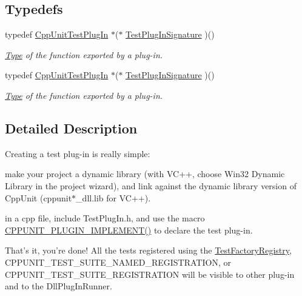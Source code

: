 \subsection*{Typedefs}
\begin{DoxyCompactItemize}
\item 
\hypertarget{group___writing_test_plug_in_gac6d885a430c48cf8b0a4534e8806c657}{typedef \hyperlink{struct_cpp_unit_test_plug_in}{Cpp\+Unit\+Test\+Plug\+In} $\ast$($\ast$ \hyperlink{group___writing_test_plug_in_gac6d885a430c48cf8b0a4534e8806c657}{Test\+Plug\+In\+Signature} )()}\label{group___writing_test_plug_in_gac6d885a430c48cf8b0a4534e8806c657}

\begin{DoxyCompactList}\small\item\em \hyperlink{struct_type}{Type} of the function exported by a plug-\/in. \end{DoxyCompactList}\item 
\hypertarget{group___writing_test_plug_in_gac6d885a430c48cf8b0a4534e8806c657}{typedef \hyperlink{struct_cpp_unit_test_plug_in}{Cpp\+Unit\+Test\+Plug\+In} $\ast$($\ast$ \hyperlink{group___writing_test_plug_in_gac6d885a430c48cf8b0a4534e8806c657}{Test\+Plug\+In\+Signature} )()}\label{group___writing_test_plug_in_gac6d885a430c48cf8b0a4534e8806c657}

\begin{DoxyCompactList}\small\item\em \hyperlink{struct_type}{Type} of the function exported by a plug-\/in. \end{DoxyCompactList}\end{DoxyCompactItemize}


\subsection{Detailed Description}
Creating a test plug-\/in is really simple\+:
\begin{DoxyItemize}
\item make your project a dynamic library (with V\+C++, choose Win32 Dynamic Library in the project wizard), and link against the dynamic library version of Cpp\+Unit (cppunit$\ast$\+\_\+dll.lib for V\+C++).
\item in a cpp file, include Test\+Plug\+In.\+h, and use the macro \hyperlink{group___writing_test_plug_in_ga705897c323d9381ac1b99a45e953e4ff}{C\+P\+P\+U\+N\+I\+T\+\_\+\+P\+L\+U\+G\+I\+N\+\_\+\+I\+M\+P\+L\+E\+M\+E\+N\+T()} to declare the test plug-\/in.
\item That's it, you're done! All the tests registered using the \hyperlink{class_test_factory_registry}{Test\+Factory\+Registry}, C\+P\+P\+U\+N\+I\+T\+\_\+\+T\+E\+S\+T\+\_\+\+S\+U\+I\+T\+E\+\_\+\+N\+A\+M\+E\+D\+\_\+\+R\+E\+G\+I\+S\+T\+R\+A\+T\+I\+O\+N, or C\+P\+P\+U\+N\+I\+T\+\_\+\+T\+E\+S\+T\+\_\+\+S\+U\+I\+T\+E\+\_\+\+R\+E\+G\+I\+S\+T\+R\+A\+T\+I\+O\+N will be visible to other plug-\/in and to the Dll\+Plug\+In\+Runner.
\end{DoxyItemize}

